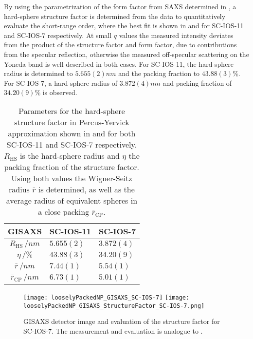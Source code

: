 \documentclass[\main/dresen_thesis.tex]{subfiles}
\begin{document}
  By using the parametrization of the form factor from SAXS determined in , a hard-sphere structure factor is determined from the data to quantitatively evaluate the short-range order, where the best fit is shown in  and  for SC-IOS-11 and SC-IOS-7 respectively.
  At small $q$ values the measured intensity deviates from the product of the structure factor and form factor, due to contributions from the specular reflection, otherwise the measured off-specular scattering on the Yoneda band is well described in both cases.
  For SC-IOS-11, the hard-sphere radius is determined to $5.655(2) \unit{nm}$ and the packing fraction to $43.88(3) \%$.
  For SC-IOS-7, a hard-sphere radius of $3.872(4) \unit{nm}$ and packing fraction of $34.20(9) \%$ is observed.
  \begin{table}[tb]
    \centering
    \caption{\label{tab:looselyPackedNP:nanoparticle:gisaxs}Parameters for the hard-sphere structure factor in Percus-Yervick approximation shown in  and  for both SC-IOS-11 and SC-IOS-7 respectively. $R_\mathrm{HS}$ is the hard-sphere radius and $\eta$ the packing fraction of the structure factor. Using both values the Wigner-Seitz radius $\bar{r}$ is determined, as well as the average radius of equivalent spheres in a close packing $\bar{r}_\mathrm{CP}$.}
    \begin{tabular}{ c | l | l }
      \rule{0pt}{2ex} \textbf{GISAXS}  & \textbf{SC-IOS-11} & \textbf{SC-IOS-7} \\
      \hline
      \rule{0pt}{2ex} $R_\mathrm{HS} \, / \unit{nm}$          & $5.655(2)$           & $3.872(4)$\\
      \rule{0pt}{2ex} $\eta          \, / \unit{\%}$          & $43.88(3)$           & $34.20(9)$\\
      \hline
      \rule{0pt}{2ex} $\bar{r}       \, / \unit{nm}$          & $7.44(1)$            & $5.54(1)$\\
      \hline
      \rule{0pt}{2ex} $\bar{r}_\mathrm{CP} \, / \unit{nm}$    & $6.73(1)$            & $5.01(1)$\\
      \hline
    \end{tabular}
  \end{table}
  \begin{figure}[tb]
    \centering
    \texttt{[image: looselyPackedNP\_GISAXS\_SC-IOS-7]}
    \texttt{[image: looselyPackedNP\_GISAXS\_StructureFactor\_SC-IOS-7.png]}
    \caption{\label{fig:looselyPackedNP:layer:gisaxsSC_IOS_7}GISAXS detector image and evaluation of the structure factor for SC-IOS-7. The measurement and evaluation is analogue to .}
  \end{figure}
\end{document}
